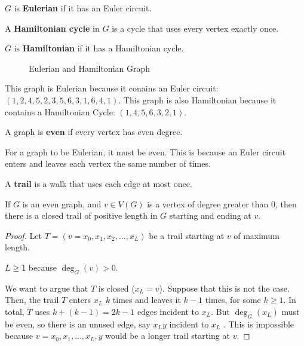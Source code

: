 \documentclass[a4paper]{article}
\begin{document}
\begin{definition}
	\( G \) is \textbf{Eulerian} if it has an Euler circuit.
\end{definition}

\begin{definition}
	A \textbf{Hamiltonian cycle} in \( G \) is a cycle that uses every vertex exactly once.
\end{definition}

\begin{definition}
	\( G \) is \textbf{Hamiltonian} if it has a Hamiltonian cycle.
\end{definition}

\begin{figure}[ht]
    \centering
    \caption{Eulerian and Hamiltonian Graph}
    \label{fig:example-graphs}
\end{figure}

This graph is Eulerian because it conains an Euler circuit: \( (1, 2, 4, 5, 2, 3, 5, 6, 3, 1, 6, 4, 1) \). This graph is also Hamiltonian because it contains a Hamiltonian Cycle: \( (1, 4, 5, 6, 3, 2, 1) \).

\begin{definition}
	A graph is \textbf{even} if every vertex has even degree.
\end{definition}

\begin{observe}
	For a graph to be Eulerian, it must be even. This is because an Euler circuit enters and leaves each vertex the same number of times.
\end{observe}

\begin{definition}
	A \textbf{trail} is a walk that uses each edge at most once.
\end{definition}

\begin{lemma}
	If \( G \) is an even graph, and \( v \in  V(G) \) is a vertex of degree greater than 0, then there is a closed trail of positive length in \( G \) starting and ending at \( v \).
\end{lemma}

\begin{proof}
	Let \( T = (v=x_{0}, x_{1}, x_{2}, \ldots , x_L)\) be a trail starting at \( v \) of maximum length.
	\begin{note}
		\( L \ge 1 \) because \( \deg_G(v)>0 \).
	\end{note}
	We want to argue that \( T \) is closed (\( x_L=v \)). Suppose that this is not the case. Then, the trail \( T \) enters \( x_L \) \( k \) times and leaves it \( k-1 \) times, for some \( k\ge 1 \). In total, \( T \) uses \( k + (k-1)=2k-1 \) edges incident to \( x_L \). But \( \deg_G(x_L) \) must be even, so there is an unused edge, say \( x_Ly \) incident to \( x_L \) \contra. This is impossible because \( v=x_{0}, x_{1}, \ldots , x_L, y \) would be a longer trail starting at \( v \).
\end{proof}
\end{document}
